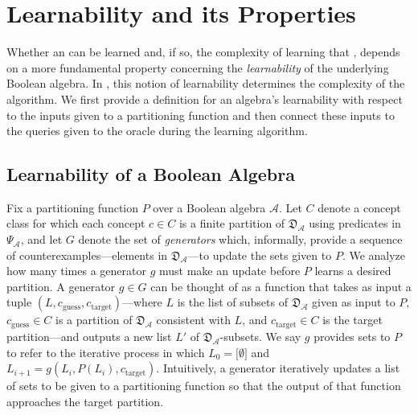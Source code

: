\section{Learnability and its Properties}
\label{sec:learnability}

Whether an \SFA can be learned and, if so, the complexity of learning that \SFA,
depends on a more fundamental property concerning the \emph{learnability}
of the underlying Boolean algebra.
In \alg,
this notion of learnability determines the
complexity of the algorithm.
We first provide a definition for an algebra's learnability
with respect to the inputs given to a partitioning function
and then connect these inputs to the queries given to the oracle
during the learning algorithm.

\subsection{Learnability of a Boolean Algebra}

Fix a partitioning function $P$ over a Boolean algebra $\mathcal{A}$.
Let $C$ denote a concept class for which each concept $c \in C$ is a finite partition
of $\mathfrak{D}_\mathcal{A}$ using predicates in $\Psi_\mathcal{A}$,
and let $G$ denote the set of \emph{generators} which, informally,
provide a sequence of counterexamples---elements
in $\mathfrak{D}_\mathcal{A}$---to update the sets given to $P$.
We analyze how many times a generator $g$ must make an update
before $P$ learns a desired partition.
A generator $g \in G$ can be thought of as a function
that takes as input
a tuple $(L, c_\text{guess}, c_\text{target})$---where
$L$ is the list of subsets of $\mathfrak{D}_\mathcal{A}$
given as input to $P$,
$c_\text{guess} \in C$ is a partition of $\mathfrak{D}_\mathcal{A}$
consistent with $L$, and
$c_\text{target} \in C$ is the target partition---and
outputs a new list $L'$ of $\mathfrak{D}_\mathcal{A}$-subsets.
We say $g$ provides sets to $P$ to refer to
the iterative process in which
$L_0 = \lbrack \emptyset \rbrack$ and
$L_{i+1} = g(L_i, P(L_i), c_\text{target})$.
Intuitively, a generator iteratively updates a list of sets
to be given to a partitioning function so that
the output of that function approaches the target partition.

